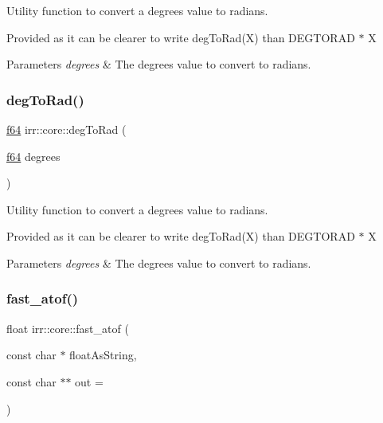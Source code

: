 Utility function to convert a degrees value to radians. 

Provided as it can be clearer to write deg\+To\+Rad(\+X) than D\+E\+G\+T\+O\+R\+AD $\ast$ X 
\begin{DoxyParams}{Parameters}
{\em degrees} & The degrees value to convert to radians. \\
\hline
\end{DoxyParams}
\mbox{\label{namespaceirr_1_1core_a2def535b4f391ceb86ec0497cbb4bf80}} 
\subsubsection{\texorpdfstring{deg\+To\+Rad()}{degToRad()}\hspace{0.1cm}{\footnotesize\ttfamily [2/2]}}
{\footnotesize\ttfamily \hyperlink{namespaceirr_a1325b02603ad449f92c68fc640af9b28}{f64} irr\+::core\+::deg\+To\+Rad (\begin{DoxyParamCaption}\item[{\hyperlink{namespaceirr_a1325b02603ad449f92c68fc640af9b28}{f64}}]{degrees }\end{DoxyParamCaption})\hspace{0.3cm}{\ttfamily [inline]}}



Utility function to convert a degrees value to radians. 

Provided as it can be clearer to write deg\+To\+Rad(\+X) than D\+E\+G\+T\+O\+R\+AD $\ast$ X 
\begin{DoxyParams}{Parameters}
{\em degrees} & The degrees value to convert to radians. \\
\hline
\end{DoxyParams}
\mbox{\label{namespaceirr_1_1core_af69b7d3604a1089438106fcce3cedb34}} 
\subsubsection{\texorpdfstring{fast\+\_\+atof()}{fast\_atof()}}
{\footnotesize\ttfamily float irr\+::core\+::fast\+\_\+atof (\begin{DoxyParamCaption}\item[{const char $\ast$}]{float\+As\+String,  }\item[{const char $\ast$$\ast$}]{out = {} }\end{DoxyParamCaption})\hspace{0.3cm}{\ttfamily [inline]}}




